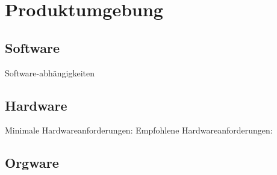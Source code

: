 \chapter{Produktumgebung}
\section{Software}
Software-abhängigkeiten
\section{Hardware}
Minimale Hardwareanforderungen:
Empfohlene Hardwareanforderungen:
\section{Orgware}
